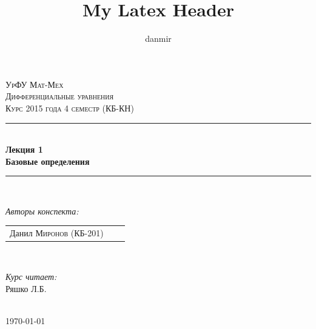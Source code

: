 \documentclass[12pt,a4paper,hidelinks]{article}            %
\begin{document}
\begin{titlepage}

\title{My Latex Header}
\author{danmir}

\vspace*{\fill}                                            %

\newcommand{\HRule}{\rule{\linewidth}{0.3mm}}              %

\center                                                    %

\textsc{\Large УрФУ Мат-Мех}\\[1.5cm]
\textsc{\Large Дифференциальные уравнения}\\[0.5cm]
\textsc{\large Курс 2015 года 4 семестр (КБ-КН)}\\[0.5cm]

\HRule \\[0.4cm]
{ \huge \bfseries Лекция 1 \\ Базовые определения}\\[0.4cm]
\HRule \\[1.5cm]

\begin{minipage}{0.4\textwidth}
\begin{flushleft} \large
\emph{Авторы конспекта:}\\
\begin{tabular}{ l c r }
  Данил \textsc{Миронов (КБ-201)}\\
\end{tabular}
\end{flushleft}
\end{minipage}
~
\begin{minipage}{0.4\textwidth}
\begin{flushright} \large
\emph{Курс читает:} \\
Ряшко Л.Б. \textsc{}                                             %
\end{flushright}
\end{minipage}\\[4cm]

{\large \today}\\[3cm]                                              %


\vspace*{\fill}                                                           %

\end{titlepage}
\end{document}

